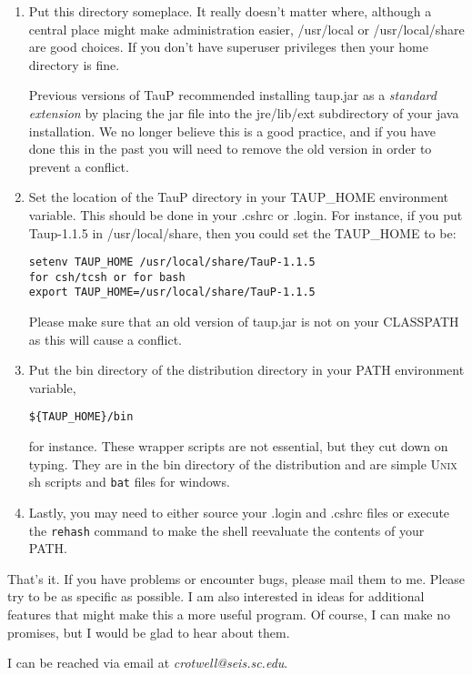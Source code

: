 \begin{enumerate}
\item Put this directory someplace. It really doesn't matter where, although
a central place might make administration easier, /usr/local or 
/usr/local/share are good choices. If you don't have superuser privileges
then your home directory is fine. 

Previous versions of TauP recommended installing taup.jar as a \textit{standard extension} by placing the jar file into the jre/lib/ext subdirectory of your java installation. We no longer believe this is a good
practice, and if you have done this in the past you will need to remove the old version in order to
prevent a conflict.

\item Set the location of the TauP directory in your TAUP\_HOME environment variable.
This should be done in your .cshrc or .login. For instance, if you put Taup-1.1.5 in
/usr/local/share, then you could set the TAUP\_HOME to be:
\begin{verbatim}
setenv TAUP_HOME /usr/local/share/TauP-1.1.5
for csh/tcsh or for bash
export TAUP_HOME=/usr/local/share/TauP-1.1.5
\end{verbatim} 

Please make sure that an old version of taup.jar is not on your CLASSPATH as this will cause a 
conflict.

\item Put the bin directory of the distribution directory in your PATH environment
variable, \begin{verbatim}${TAUP_HOME}/bin\end{verbatim} for instance. These wrapper 
scripts are not essential, but they cut down on 
typing. They are in the bin directory of the distribution 
and are simple \textsc{Unix} sh scripts and \texttt{bat} files for windows.

\item Lastly, you may need to either source your .login and .cshrc files or
execute the \texttt{rehash} command to make the shell reevaluate the 
contents of your PATH.

\end{enumerate}

That's it. If you have problems or encounter bugs, please mail them to me.
Please try to be as specific as possible. I am also interested in ideas for
additional features that might make this a more useful program. 
Of course, I can make no promises,
but I would be glad to hear about them.

I can be reached via email at \textit{crotwell@seis.sc.edu}.

